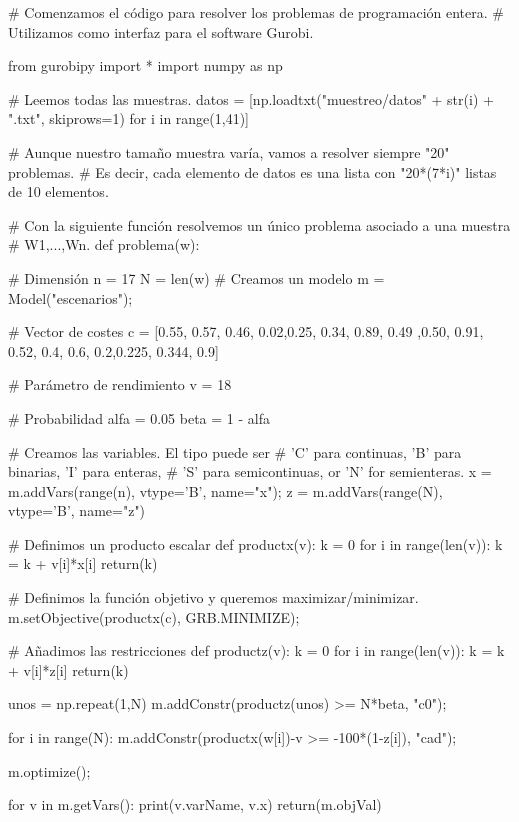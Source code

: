 \documentclass[twoside,a4paper,openright,12pt]{book}
\begin{document}
\newpage 
\begin{pythone}# Comenzamos el código para resolver los problemas de programación entera.
# Utilizamos como interfaz para el software Gurobi.

from gurobipy import *
import numpy as np

# Leemos todas las muestras.
datos = [np.loadtxt("muestreo/datos" + str(i) + ".txt", skiprows=1) for i in range(1,41)]

# Aunque nuestro tamaño muestra varía, vamos a resolver siempre "20" problemas.
# Es decir, cada elemento de datos es una lista con "20*(7*i)" listas de 10 elementos.

# Con la siguiente función resolvemos un único problema asociado a una muestra
# W1,...,Wn.
def problema(w):
    
    # Dimensión
    n = 17
    N = len(w)
    # Creamos un modelo
    m = Model("escenarios");
    
    # Vector de costes
    c = [0.55, 0.57, 0.46, 0.02,0.25, 0.34, 0.89, 0.49 ,0.50, 0.91,
      0.52, 0.4, 0.6, 0.2,0.225, 0.344, 0.9]
    
    # Parámetro de rendimiento
    v = 18
    
    # Probabilidad
    alfa = 0.05
    beta = 1 - alfa

    # Creamos las variables. El tipo puede ser 
    # 'C' para continuas, 'B' para binarias, 'I' para enteras,
    # 'S' para semicontinuas, or 'N' for semienteras.
    x = m.addVars(range(n), vtype='B', name="x");
    z = m.addVars(range(N), vtype='B', name="z")
    
    
    # Definimos un producto escalar 
    def productx(v):
        k = 0
        for i in range(len(v)):
            k = k + v[i]*x[i]
        return(k)    
                
    # Definimos la función objetivo y queremos maximizar/minimizar.
    m.setObjective(productx(c), GRB.MINIMIZE);
                
    # Añadimos las restricciones
    def productz(v):
        k = 0
        for i in range(len(v)):
            k = k + v[i]*z[i]
        return(k)   
        
    unos = np.repeat(1,N)
    m.addConstr(productz(unos) >= N*beta, "c0");
    
    for i in range(N):
        m.addConstr(productx(w[i])-v >= -100*(1-z[i]), "cad");
                         
    m.optimize();      
       
    for v in m.getVars():
        print(v.varName, v.x)
    return(m.objVal)  


\end{pythone}
\end{document}
